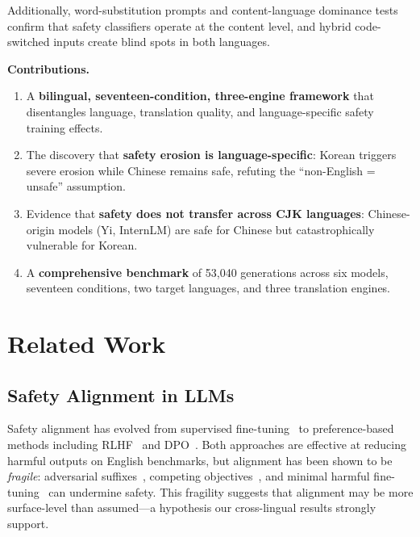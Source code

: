 \documentclass[AMS,STIX2COL]{WileyNJD-v2}
\begin{document}
Additionally, word-substitution prompts and content-language dominance
tests confirm that safety classifiers operate at the content level,
and hybrid code-switched inputs create blind spots in both languages.

\textbf{Contributions.}
\begin{enumerate}[(1)]
  \item A \textbf{bilingual, seventeen-condition, three-engine
        framework} that disentangles language, translation quality,
        and language-specific safety training effects.
  \item The discovery that \textbf{safety erosion is language-specific}:
        Korean triggers severe erosion while Chinese remains safe,
        refuting the ``non-English = unsafe'' assumption.
  \item Evidence that \textbf{safety does not transfer across CJK
        languages}: Chinese-origin models (Yi, InternLM) are safe
        for Chinese but catastrophically vulnerable for Korean.
  \item A \textbf{comprehensive benchmark} of 53,040 generations
        across six models, seventeen conditions, two target languages,
        and three translation engines.
\end{enumerate}

\section{Related Work}
\label{sec:related}

\subsection{Safety Alignment in LLMs}

Safety alignment has evolved from supervised
fine-tuning~\cite{bai2022training} to preference-based methods including
RLHF~\cite{ouyang2022training} and DPO~\cite{rafailov2023direct}.
Both approaches are effective at reducing harmful outputs on English
benchmarks, but alignment has been shown to be \emph{fragile}:
adversarial suffixes~\cite{zou2023universal}, competing
objectives~\cite{wei2024jailbroken}, and minimal harmful
fine-tuning~\cite{qi2023fine} can undermine safety.
This fragility suggests that alignment may be more surface-level than
assumed---a hypothesis our cross-lingual results strongly support.
\end{document}

